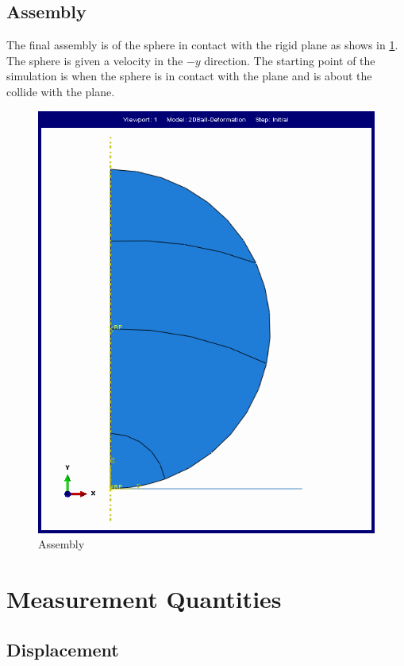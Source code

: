 \subsection{Assembly}

The final assembly is of the sphere in contact with the rigid plane as shows in \ref{fig:assembly}. The sphere is given a velocity in the $-y$ direction. The starting point of the simulation is when the sphere is in contact with the plane and is about the collide with the plane.
\begin{figure}[H]
    \centering
	\includegraphics[scale=0.25]{../images/SimulationSetup/Assembly.png}
	\caption{Assembly}
	\label{fig:assembly}
\end{figure}

\section{Measurement Quantities}

\subsection{Displacement}

